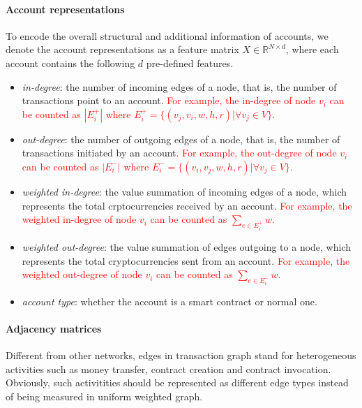

\paragraph{Account representations} To encode the overall structural and additional information of accounts, we denote the account representations as a feature matrix $X \in \mathbb{R}^{N \times d}$, where each account contains the following $d$ pre-defined features.

\begin{itemize}
	\item \emph{in-degree}: the number of incoming edges of a node, that is, the number of transactions point to an account. \textcolor{red}{For example, the in-degree of node $v_i$ can be counted as $|E_{i}^{+}|$ where $E_{i}^{+}=\{(v_j,v_i,w,h,r)| \forall v_j \in V\}$.}
	\item \emph{out-degree}: the number of outgoing edges of a node, that is, the number of transactions initiated by an account. \textcolor{red}{For example, the out-degree of node $v_i$ can be counted as $|E_{i}^{-}|$ where $E_{i}^{-}=\{(v_i,v_j,w,h,r)| \forall v_j \in V\}$.}
	\item \emph{weighted in-degree}: the value summation of incoming edges of a node, which represents the total crptocurrencies received by an account. \textcolor{red}{For example, the weighted in-degree of node $v_i$ can be counted as $\sum_{e\in E_{i}^{+}}w$.}
	\item \emph{weighted out-degree}: the value summation of edges outgoing to a node, which represents the total cryptocurrencies sent from an account. \textcolor{red}{For example, the weighted out-degree of node $v_i$ can be counted as $\sum_{e\in E_{i}^{-}}w$.}
	\item \emph{account type}: whether the account is a smart contract or normal one.
\end{itemize}

\paragraph{Adjacency matrices} Different from other networks, edges in transaction graph stand for heterogeneous activities such as money transfer, contract creation and contract invocation. Obviously, such %
activitities should be represented as different edge types instead of being measured in uniform weighted graph.


